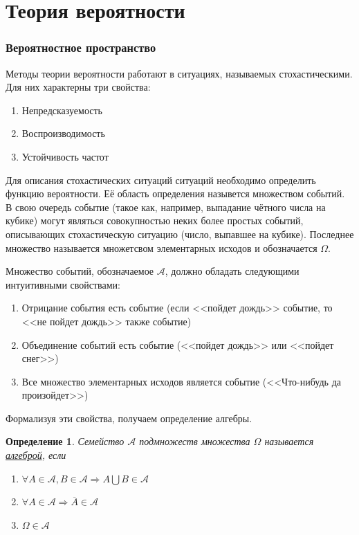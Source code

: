 \documentclass[12pt]{article}
\newtheorem{Def}{Определение}
\numberwithin{Th}{section}
\numberwithin{Def}{section}
\numberwithin{Lem}{section}
\numberwithin{St}{section}
\numberwithin{equation}{section}
\newcommand\Ev{\mathscr{A}} %
\begin{document}
\tableofcontents
\newpage

\part{Теория вероятности}
\newpage

\section{Вероятностное пространство}
\qquad Методы теории вероятности работают в ситуациях, называемых стохастическими. Для них характерны три свойства:
\begin{enumerate}
	\item Непредсказуемость 
	\item Воспроизводимость 
	\item Устойчивость частот
\end{enumerate}

Для описания стохастических ситуаций ситуаций необходимо определить функцию вероятности. Её область определения назывется множеством событий.
В свою очередь событие (такое как, например, выпадание чётного числа на кубике) могут являться совокупностью неких более простых событий, описывающих стохастическую ситуацию (число, выпавшее на кубике). Последнее множество называется множетсвом элементарных исходов и обозначается $\Omega$.  

Множество событий, обозначаемое $\Ev$, должно обладать следующими интуитивными свойствами:
\begin{enumerate}
	\item Отрицание события есть событие (если <<пойдет дождь>> событие, то <<не пойдет дождь>> также событие)
	\item Объединение событий есть событие (<<пойдет дождь>> или <<пойдет снег>>)
	\item Все множество элементарных исходов является событие (<<Что-нибудь да произойдет>>)
\end{enumerate}

Формализуя эти свойства, получаем определение алгебры.
\begin{Def}
Семейство $\Ev$ подмножеств множества $\Omega$  называется \\ \underline{алгеброй}, если 
\begin{enumerate}
	\item $\forall A \in \Ev, B\in \Ev \Rightarrow A \bigcup B \in \Ev$
	\item $\forall A \in \Ev \Rightarrow \overline{A} \in \Ev$
	\item $\Omega \in \Ev$
\end{enumerate}
\end{Def}
\end{document}
